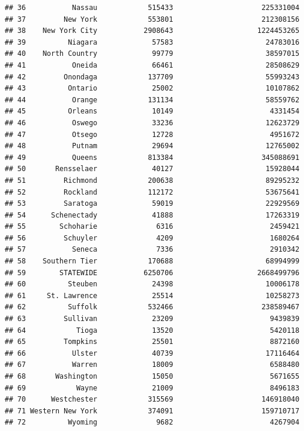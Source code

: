 \documentclass[
  12pt,
]{article}
\begin{document}
\begin{verbatim}
## 36           Nassau            515433                     225331004
## 37         New York            553801                     212308156
## 38    New York City           2908643                    1224453265
## 39          Niagara             57583                      24783016
## 40    North Country             99779                      38597015
## 41           Oneida             66461                      28508629
## 42         Onondaga            137709                      55993243
## 43          Ontario             25002                      10107862
## 44           Orange            131134                      58559762
## 45          Orleans             10149                       4331454
## 46           Oswego             33236                      12623729
## 47           Otsego             12728                       4951672
## 48           Putnam             29694                      12765002
## 49           Queens            813384                     345088691
## 50       Rensselaer             40127                      15928044
## 51         Richmond            200638                      89295232
## 52         Rockland            112172                      53675641
## 53         Saratoga             59019                      22929569
## 54      Schenectady             41888                      17263319
## 55        Schoharie              6316                       2459421
## 56         Schuyler              4209                       1680264
## 57           Seneca              7336                       2910342
## 58    Southern Tier            170688                      68994999
## 59        STATEWIDE           6250706                    2668499796
## 60          Steuben             24398                      10006178
## 61     St. Lawrence             25514                      10258273
## 62          Suffolk            532466                     238589467
## 63         Sullivan             23209                       9439839
## 64            Tioga             13520                       5420118
## 65         Tompkins             25501                       8872160
## 66           Ulster             40739                      17116464
## 67           Warren             18009                       6588480
## 68       Washington             15050                       5671655
## 69            Wayne             21009                       8496183
## 70      Westchester            315569                     146918040
## 71 Western New York            374091                     159710717
## 72          Wyoming              9682                       4267904

\end{verbatim}
\end{document}
